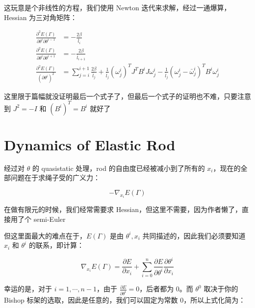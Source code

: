\documentclass{notes}
\begin{document}
这玩意是个非线性的方程，我们使用 Newton 迭代来求解，经过一通爆算，Hessian 为三对角矩阵：

\begin{equation}
	\begin{aligned}
		\frac{\partial ^2 E(\Gamma)}{\partial \theta^i \partial \theta^{i - 1}} &= - \frac{2 \beta}{\bar{l}_i} \\
		\frac{\partial ^2 E(\Gamma)}{\partial \theta^i \partial \theta^{i + 1}} &= - \frac{2 \beta}{\bar{l}_{i + 1}} \\
		\frac{\partial ^2 E(\Gamma)}{(\partial \theta^i)^2} &= \sum\limits_{j = i}^{i + 1} \frac{2 \beta}{\bar{l}_j} + \frac{1}{\bar{l}_j}(\omega_j^i)^TJ^T B^iJ \omega_j^i - \frac{1}{\bar{l}_j}(\omega_j^i - \bar{\omega}_j^i)^T B^i \omega_j^i 
	\end{aligned}
\end{equation}

\begin{remark}
	这里限于篇幅就没证明最后一个式子了，但最后一个式子的证明也不难，只要注意到 $J^2 = -I$ 和 $(B^i)^T = B^i$ 就好了
\end{remark}

\section{Dynamics of Elastic Rod}

经过对 $\theta$ 的 quasistatic 处理，rod 的自由度已经被减小到了所有的 $x_i$，现在的全部问题在于求绳子受的广义力：

$$-\nabla_{x_i} E(\Gamma)$$

\begin{remark}
	在做有限元的时候，我们经常需要求 Hessian，但这里不需要，因为作者懒了，直接用了个 semi-Euler
\end{remark}

但这里面最大的难点在于，$E(\Gamma)$ 是由 $\theta^i, x_i$ 共同描述的，因此我们必须要知道 $x_i$ 和 $\theta^i$ 的联系，即计算：

\begin{equation}
	\nabla_{x_i} E(\Gamma) = \frac{\partial E}{\partial x_i} + \sum\limits_{i = 0}^{n} \frac{\partial E}{\partial \theta^i} \frac{\partial \theta^i}{\partial x_i}
\end{equation}

幸运的是，对于 $i = 1, \cdots, n - 1$，由于 $\frac{\partial E}{\partial \theta^i} = 0$，后者都为 $0$。而 $\theta^0$ 取决于你的 Bishop 标架的选取，因此是任意的，我们可以固定为常数 $0$，所以上式化简为：
\end{document}
